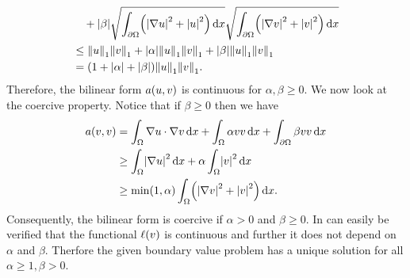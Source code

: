 \documentclass[english]{exercise}
\begin{document}
\begin{enumerate}
\begin{align*}
			&\quad + \absolute*{\beta}\sqrt{\int_{\partial\Omega}\parentheses*{\absolute*{\nabla u}^2 + \absolute*{u}^2}\d x}\sqrt{\int_{\partial\Omega}\parentheses*{\absolute*{\nabla v}^2 + \absolute*{v}^2}\d x}\\
			&\le \norm*{u}_1 \norm*{v}_1 + \absolute*{\alpha}\norm*{u}_1 \norm*{v}_1 + \absolute*{\beta}\norm*{u}_1 \norm*{v}_1\\
			&= \parentheses*{1 + \absolute*{\alpha} + \absolute*{\beta}}\norm*{u}_1 \norm*{v}_1.
		\end{align*}
		Therefore, the bilinear form \(a\parentheses*{u, v}\) is continuous for \(\alpha, \beta \ge 0\).
		We now look at the coercive property.
		Notice that if \(\beta \ge 0\) then we have
		\begin{align*}
			a\parentheses*{v, v} &= \int_\Omega \nabla u \cdot \nabla v\d x + \int_\Omega \alpha vv\d x + \int_{\partial\Omega}\beta vv\d x\\
			&\ge \int_\Omega \absolute*{\nabla u}^2 \d x + \alpha\int_\Omega \absolute*{v}^2 \d x\\
			&\ge \min\parentheses*{1, \alpha}\int_\Omega \parentheses*{\absolute*{\nabla v}^2 + \absolute*{v}^2}\d x.
		\end{align*}
		Consequently, the bilinear form is coercive if \(\alpha > 0\) and \(\beta \ge 0\).
		In can easily be verified that the functional \(\ell\parentheses*{v}\) is continuous and further it does not depend on \(\alpha\) and \(\beta\).
		Therfore the given boundary value problem has a unique solution for all \(\alpha \ge 1, \beta > 0\).
	\end{enumerate}
\end{document}
